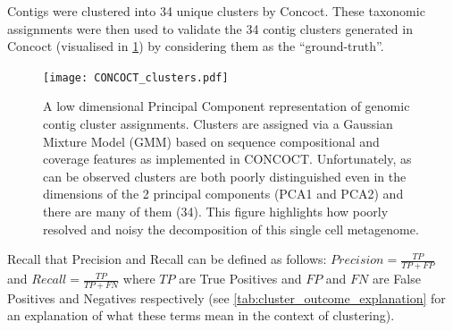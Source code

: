 Contigs were clustered into 34 unique clusters by Concoct.
These taxonomic assignments were then used to validate the 34 contig clusters 
generated in Concoct (visualised in \cref{fig:concoct_clusters}) by considering them
as the ``ground-truth''.

\begin{figure}
	\texttt{[image: CONCOCT\_clusters.pdf]}
    \caption[Genomic contig clustering]{A low dimensional Principal Component representation of genomic contig
		cluster assignments.  Clusters are assigned via a Gaussian Mixture Model (GMM) 
		based on sequence compositional and coverage features as implemented in CONCOCT.
		Unfortunately, as can be observed clusters are both poorly distinguished even
        in the dimensions of the 2 principal components (PCA1 and PCA2) and there are many of them (34).
    This figure highlights how poorly resolved and noisy the decomposition of this single cell
    metagenome.}
	\label{fig:concoct_clusters}
\end{figure}

\begin{table}
    \caption[Explanation of Clustering Errors]{A contextual explanation of True and False Positive and Negatives in the context of contig binning/clustering.  Top left indicates what a
		True Positive (TP) means in this context, bottom left a False Positive (FP).  Similarly Top Right explains a True Negative (TN) and Bottom Right a
		False Negative (FN)}
	\label{tab:cluster_outcome_explanation}
\end{table}

Recall that Precision and Recall can be defined as follows:
\( Precision = \frac{TP}{TP+FP}\) and \(Recall = \frac{TP}{TP+FN} \)
where \(TP\) are True Positives and \(FP\) and \(FN\) are False Positives
and Negatives respectively (see \cref{tab:cluster_outcome_explanation} for an 
explanation of what these terms mean in the context of clustering).

